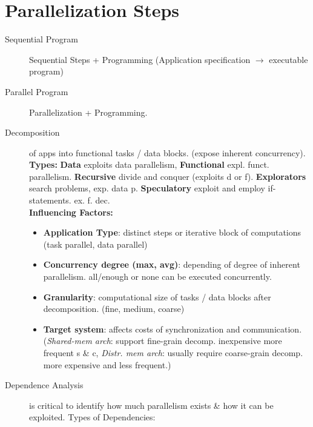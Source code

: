 \section*{Parallelization Steps}
\vspace{10\baselineskip}
\begin{description}
    \item[Sequential Program]Sequential Steps + Programming (Application specification $\rightarrow$ executable program)
    \item[Parallel Program]Parallelization + Programming. \\
        \item[Decomposition] of apps into functional tasks / data blocks. (expose inherent concurrency). \textbf{Types:} \textbf{Data} exploits data parallelism, \textbf{Functional} expl. funct. parallelism. \textbf{Recursive} divide and conquer (exploits d or f). \textbf{Explorators} search problems, exp. data p. \textbf{Speculatory} exploit and employ if-statements. ex. f. dec. \\
        \textbf{Influencing Factors:}
        \begin{itemize}
            \item \textbf{Application Type}: distinct steps or iterative block of computations (task parallel, data parallel)
            \item \textbf{Concurrency degree (max, avg)}: depending of degree of inherent parallelism. all/enough or none can be executed concurrently.
            \item \textbf{Granularity}: computational size of tasks / data blocks after decomposition. (fine, medium, coarse)
            \item \textbf{Target system}: affects costs of synchronization and communication. (\textit{Shared-mem arch}: support fine-grain decomp. inexpensive more frequent s \& c, \textit{Distr. mem arch}: usually require coarse-grain decomp. more expensive and less frequent.)
        \end{itemize} %
    \item[Dependence Analysis]is critical to identify how much parallelism exists \& how it can be exploited. Types of Dependencies:
        \begin{itemize}

\end{itemize}
\end{description}

